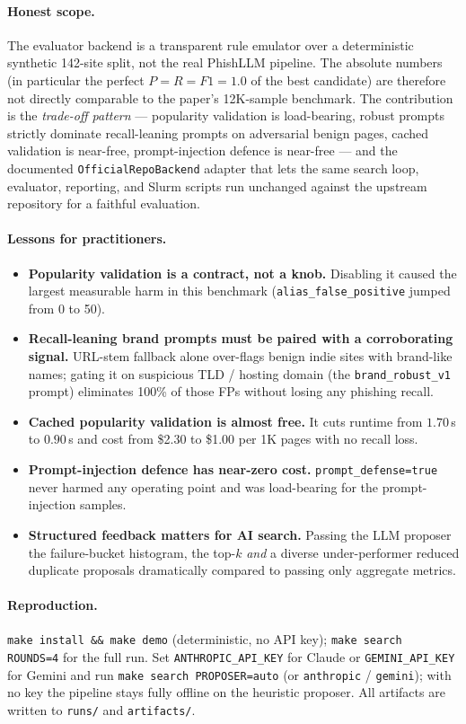 \documentclass[11pt,a4paper]{article}
\begin{document}
\paragraph{Honest scope.}
The evaluator backend is a transparent rule emulator over a deterministic
synthetic 142-site split, not the real PhishLLM pipeline. The absolute
numbers (in particular the perfect $P\!=\!R\!=\!F1\!=\!1.0$ of the best
candidate) are therefore not directly comparable to the paper's 12K-sample
benchmark. The contribution is the \emph{trade-off pattern} ---
popularity validation is load-bearing, robust prompts strictly dominate
recall-leaning prompts on adversarial benign pages, cached validation is
near-free, prompt-injection defence is near-free --- and the documented
\texttt{OfficialRepoBackend} adapter that lets the same search loop,
evaluator, reporting, and Slurm scripts run unchanged against the upstream
repository for a faithful evaluation.

\paragraph{Lessons for practitioners.}
\begin{itemize}
    \item \textbf{Popularity validation is a contract, not a knob.}
    Disabling it caused the largest measurable harm in this benchmark
    (\texttt{alias\_false\_positive} jumped from 0 to 50).
    \item \textbf{Recall-leaning brand prompts must be paired with a
    corroborating signal.} URL-stem fallback alone over-flags benign indie
    sites with brand-like names; gating it on suspicious TLD / hosting
    domain (the \texttt{brand\_robust\_v1} prompt) eliminates 100\% of
    those FPs without losing any phishing recall.
    \item \textbf{Cached popularity validation is almost free.} It cuts
    runtime from $1.70$\,s to $0.90$\,s and cost from \$2.30 to \$1.00 per
    1K pages with no recall loss.
    \item \textbf{Prompt-injection defence has near-zero cost.}
    \texttt{prompt\_defense=true} never harmed any operating point and was
    load-bearing for the prompt-injection samples.
    \item \textbf{Structured feedback matters for AI search.} Passing the
    LLM proposer the failure-bucket histogram, the top-$k$ \emph{and} a
    diverse under-performer reduced duplicate proposals dramatically
    compared to passing only aggregate metrics.
\end{itemize}

\paragraph{Reproduction.}
\texttt{make install \&\& make demo} (deterministic, no API key);
\texttt{make search ROUNDS=4} for the full run. Set
\texttt{ANTHROPIC\_API\_KEY} for Claude or \texttt{GEMINI\_API\_KEY} for
Gemini and run \texttt{make search PROPOSER=auto} (or \texttt{anthropic}
/ \texttt{gemini}); with no key the pipeline stays fully offline on the
heuristic proposer. All artifacts are written to \texttt{runs/} and
\texttt{artifacts/}.
\end{document}
